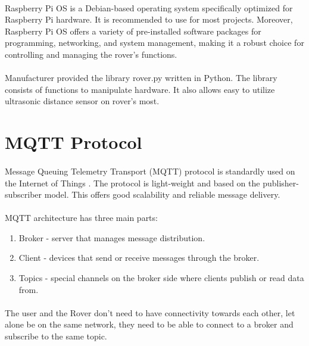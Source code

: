 \paragraph{}Raspberry Pi OS is a Debian-based operating system specifically optimized for Raspberry Pi hardware. It is recommended to use for most projects. Moreover, Raspberry Pi OS offers a variety of pre-installed software packages for programming, networking, and system management, making it a robust choice for controlling and managing the rover's functions.\paragraph{} 

Manufacturer provided the library rover.py written in Python. The library consists of functions to manipulate hardware. It also allows easy to utilize ultrasonic distance sensor on rover's most.

\section{MQTT Protocol}%

\paragraph{}Message Queuing Telemetry Transport (MQTT) protocol is standardly used on the Internet of Things \cite{mqtt:spec}. The protocol is light-weight and based on the publisher-subscriber model. This offers good scalability and reliable message delivery.\paragraph{}

MQTT architecture has three main parts:
\begin{enumerate}
    \item Broker - server that manages message distribution.
    \item Client - devices that send or receive messages through the broker.
    \item Topics - special channels on the broker side where clients publish or read data from.
\end{enumerate}
\paragraph{}The user and the Rover don’t need to have connectivity towards each other, let alone be on the same network, they need to be able to connect to a broker and subscribe to the same topic.

